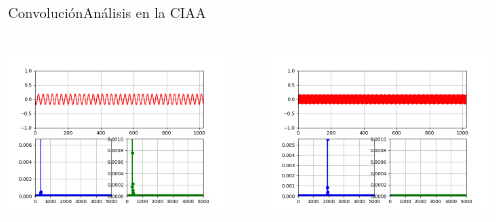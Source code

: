 \begin{frame}[c]{Convolución}{Análisis en la CIAA}
   \protoboardicon
   \begin{columns}[c]
      \hspace{2pt}
      \begin{column}{.5\textwidth}
         \centering\includegraphics[width=0.9\textwidth]{4_clase/convolucion_ciaa_pasabanda1}
      \end{column}
      \hspace{2pt}
      \vrule
      \hspace{2pt}
      \begin{column}{.5\textwidth}
         \centering\includegraphics[width=0.9\textwidth]{4_clase/convolucion_ciaa_pasabanda2}
      \end{column}
   \end{columns}
   \vfill
\end{frame}
